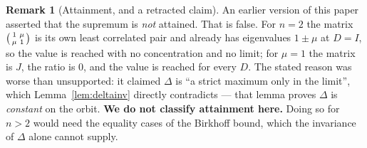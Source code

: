 \documentclass[11pt,a4paper]{article}
\theoremstyle{plain}
\theoremstyle{definition}
\newtheorem{remark}[theorem]{Remark}
\begin{document}
\begin{remark}[Attainment, and a retracted claim]\label{rem:attained}
An earlier version of this paper asserted that the supremum is \emph{not}
attained. That is false. For $n=2$ the matrix
$\begin{psmallmatrix}1&\mu\\ \mu&1\end{psmallmatrix}$ is its own least
correlated pair and already has eigenvalues $1\pm\mu$ at $D=I$, so the value is
reached with no concentration and no limit; for $\mu=1$ the matrix is $J$, the
ratio is $0$, and the value is reached for every $D$. The stated reason was
worse than unsupported: it claimed $\Delta$ is ``a strict maximum only in the
limit'', which Lemma~\ref{lem:deltainv} directly contradicts --- that lemma
proves $\Delta$ is \emph{constant} on the orbit. \textbf{We do not classify
attainment here.} Doing so for $n>2$ would need the equality cases of the
Birkhoff bound, which the invariance of $\Delta$ alone cannot supply.
\end{remark}
\end{document}
